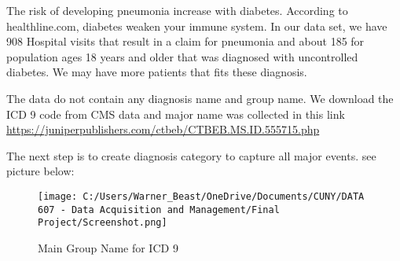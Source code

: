 \documentclass[
]{article}
\newenvironment{Shaded}{\begin{snugshade}}{\end{snugshade}}
\newcommand{\AttributeTok}[1]{\textcolor[rgb]{0.13,0.29,0.53}{#1}}
\newcommand{\CommentTok}[1]{\textcolor[rgb]{0.56,0.35,0.01}{\textit{#1}}}
\newcommand{\DecValTok}[1]{\textcolor[rgb]{0.00,0.00,0.81}{#1}}
\newcommand{\FunctionTok}[1]{\textcolor[rgb]{0.13,0.29,0.53}{\textbf{#1}}}
\newcommand{\NormalTok}[1]{#1}
\newcommand{\OtherTok}[1]{\textcolor[rgb]{0.56,0.35,0.01}{#1}}
\newcommand{\SpecialCharTok}[1]{\textcolor[rgb]{0.81,0.36,0.00}{\textbf{#1}}}
\newcommand{\StringTok}[1]{\textcolor[rgb]{0.31,0.60,0.02}{#1}}
\begin{document}
\begin{Shaded}
\end{Shaded}

The risk of developing pneumonia increase with diabetes. According to
healthline.com, diabetes weaken your immune system. In our data set, we
have 908 Hospital visits that result in a claim for pneumonia and about
185 for population ages 18 years and older that was diagnosed with
uncontrolled diabetes. We may have more patients that fits these
diagnosis.

The data do not contain any diagnosis name and group name. We download
the ICD 9 code from CMS data and major name was collected in this link
\url{https://juniperpublishers.com/ctbeb/CTBEB.MS.ID.555715.php}

The next step is to create diagnosis category to capture all major
events. see picture below:

\begin{figure}
\centering
\texttt{[image: C:/Users/Warner\_Beast/OneDrive/Documents/CUNY/DATA 607 - Data Acquisition and Management/Final Project/Screenshot.png]}
\caption{Main Group Name for ICD 9}
\end{figure}
\end{document}
